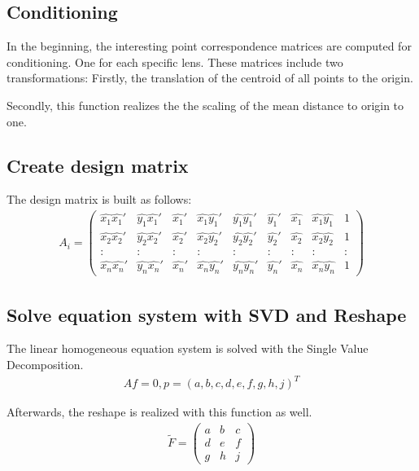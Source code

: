 \documentclass[a4paper,headings=small]{scrartcl}
\numberwithin{equation}{section} %
\numberwithin{figure}{section}   %
\begin{document}
  \subsection{Conditioning}

  In the beginning, the interesting point correspondence matrices are computed for conditioning.
  One for each specific lens.
  These matrices include two transformations: 
  Firstly, the translation of the centroid of all points to the origin.

  Secondly, this function realizes the the scaling of the mean distance to origin to one.

  \subsection{Create design matrix}

  The design matrix is built as follows: \\
  \begin{align}
  A_{i}=
  \left( \begin{array}{ccccccccc}
  \hat{x_1}\hat{x_1}' & \hat{y_1}\hat{x_1}' & \hat{x_1}' & \hat{x_1}\hat{y_1}' & \hat{y_1}\hat{y_1}' & \hat{y_1}' & \hat{x_1} & \hat{x_1}\hat{y_1} & 1\\
  \hat{x_2}\hat{x_2}' & \hat{y_2}\hat{x_2}' & \hat{x_2}' & \hat{x_2}\hat{y_2}' & \hat{y_2}\hat{y_2}' & \hat{y_2}' & \hat{x_2} & \hat{x_2}\hat{y_2} & 1\\
   : & : & : & : & : & : & : & : & : \\
  \hat{x_n}\hat{x_n}' & \hat{y_n}\hat{x_n}' & \hat{x_n}' & \hat{x_n}\hat{y_n}' & \hat{y_n}\hat{y_n}' & \hat{y_n}' & \hat{x_n} & \hat{x_n}\hat{y_n} & 1
  \end{array} \right) 
  \end{align}

  \subsection{Solve equation system with SVD and Reshape}

  The linear homogeneous equation system is solved with the Single Value Decomposition.
  \begin{align}
  Af=0, p=(a,b,c,d,e,f,g,h,j)^T 
  \end{align}

  Afterwards, the reshape is realized with this function as well.
  \begin{align}
  \tilde{F}=
  \left( \begin{array}{cccc}
  a & b & c \\
  d & e & f \\ 
  g & h & j
  \end{array} \right)
  \end{align}
\end{document}
